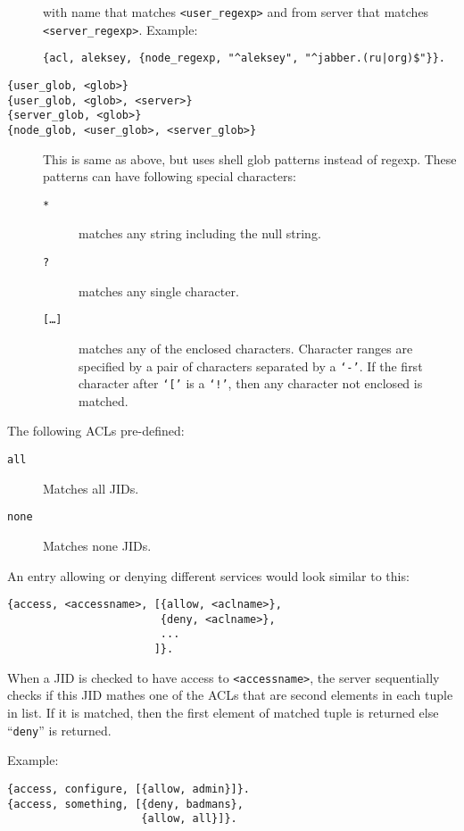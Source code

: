 \documentclass[10pt]{article}
\begin{document}
\begin{description}
  with name that matches \texttt{<user\_regexp>} and from server that matches
  \texttt{<server\_regexp>}.  Example:
\begin{verbatim}
{acl, aleksey, {node_regexp, "^aleksey", "^jabber.(ru|org)$"}}.
\end{verbatim}
\item[\texttt{\{user\_glob, <glob>\}}]
\item[\texttt{\{user\_glob, <glob>, <server>\}}]
\item[\texttt{\{server\_glob, <glob>\}}]
\item[\texttt{\{node\_glob, <user\_glob>, <server\_glob>\}}] This is same as
  above, but uses shell glob patterns instead of regexp.  These patterns can
  have following special characters:
  \begin{description}
  \item[\texttt{*}] matches any string including the null string.
  \item[\texttt{?}] matches any single character.
  \item[\texttt{[\ldots{}]}] matches any of the enclosed characters.  Character
    ranges are specified by a pair of characters separated by a \texttt{`-'}.
    If the first character after \texttt{`['} is a \texttt{`!'}, then any
    character not enclosed is matched.
  \end{description}
\end{description}

The following ACLs pre-defined:
\begin{description}
\item[\texttt{all}] Matches all JIDs.
\item[\texttt{none}] Matches none JIDs.
\end{description}

An entry allowing or denying different services would look similar to this:
\begin{verbatim}
{access, <accessname>, [{allow, <aclname>},
                        {deny, <aclname>},
                        ...
                       ]}.
\end{verbatim}
When a JID is checked to have access to \texttt{<accessname>}, the server
sequentially checks if this JID mathes one of the ACLs that are second elements
in each tuple in list.  If it is matched, then the first element of matched
tuple is returned else ``\texttt{deny}'' is returned.

Example:
\begin{verbatim}
{access, configure, [{allow, admin}]}.
{access, something, [{deny, badmans},
                     {allow, all}]}.
\end{verbatim}
\end{document}
